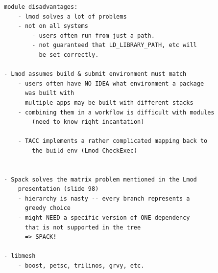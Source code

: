 \begin{verbatim}
module disadvantages:
	- lmod solves a lot of problems
	- not on all systems
		- users often run from just a path.
		- not guaranteed that LD_LIBRARY_PATH, etc will
		  be set correctly.

- Lmod assumes build & submit environment must match
	- users often have NO IDEA what environment a package
	  was built with
	- multiple apps may be built with different stacks
	- combining them in a workflow is difficult with modules
		(need to know right incantation)

	- TACC implements a rather complicated mapping back to
	    the build env (Lmod CheckExec)
	

- Spack solves the matrix problem mentioned in the Lmod
    presentation (slide 98)
	- hierarchy is nasty -- every branch represents a
	  greedy choice
	- might NEED a specific version of ONE dependency
	  that is not supported in the tree
	  => SPACK!

- libmesh
	- boost, petsc, trilinos, grvy, etc.
\end{verbatim}


